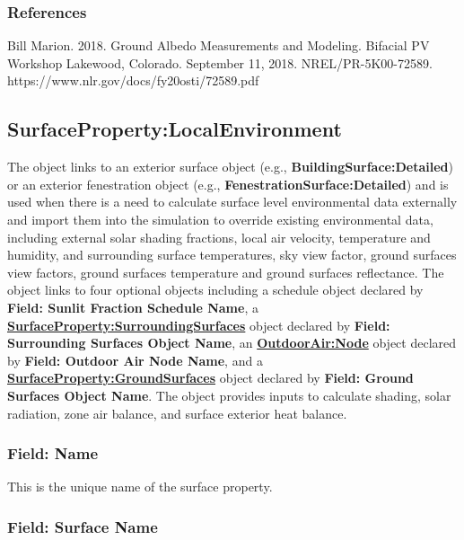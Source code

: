 \subsubsection{References}\label{references-gnd-srfs}

Bill Marion. 2018. Ground Albedo Measurements and Modeling. Bifacial PV Workshop Lakewood, Colorado. September 11, 2018.
NREL/PR-5K00-72589. https://www.nlr.gov/docs/fy20osti/72589.pdf

\subsection{SurfaceProperty:LocalEnvironment}\label{surfacePropertylocalEnvironment}

The object links to an exterior surface object (e.g., \textbf{BuildingSurface:Detailed}) or an exterior fenestration object (e.g., \textbf{FenestrationSurface:Detailed}) and is used when there is a need to calculate surface level environmental data externally and import them into the simulation to override existing environmental data, including external solar shading fractions, local air velocity, temperature and humidity, and surrounding surface temperatures, sky view factor, ground surfaces view factors, ground surfaces temperature and ground surfaces reflectance. The object links to four optional objects including a schedule object declared by \textbf{Field: Sunlit Fraction Schedule Name}, a \textbf{\hyperref[surfacePropertySurroundingSurfaces]{SurfaceProperty:SurroundingSurfaces}} object declared by \textbf{Field: Surrounding Surfaces Object Name}, an \textbf{\hyperref[outdoorairnode]{OutdoorAir:Node}} object declared by \textbf{Field: Outdoor Air Node Name}, and a \textbf{\hyperref[surfacePropertyGroundSurfaces]{SurfaceProperty:GroundSurfaces}} object declared by
\textbf{Field: Ground Surfaces Object Name}. The object provides inputs to calculate shading, solar radiation, zone air balance, and surface exterior heat balance.

\subsubsection{Field: Name}\label{field-surf-localenv-name}

This is the unique name of the surface property.

\subsubsection{Field: Surface Name}\label{surfacePropertylocalEnvironment-field-surface-name}

